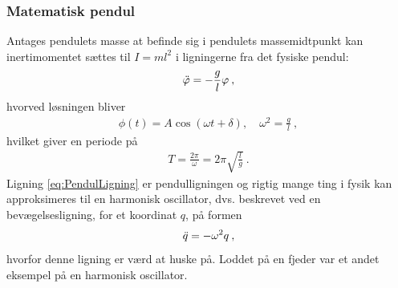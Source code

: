 \subsubsection*{Matematisk pendul}
Antages pendulets masse at befinde sig i pendulets massemidtpunkt kan inertimomentet sættes til $I=ml^2$ i ligningerne fra det fysiske pendul:
%
\begin{align} \label{eq:PendulLigning}
	\ddot{\varphi} = -\frac{g}{l}\varphi \: ,
\end{align}
%
hvorved løsningen bliver
%
\begin{align}
	\phi(t) = A\cos\left(\omega t + \delta\right), \quad \omega^2 = \frac{g}{l} \: ,
\end{align}
%
hvilket giver en periode på
%
\begin{align}
	T = \frac{2\pi}{\omega} = 2\pi\sqrt{\frac{l}{g}} \: .
\end{align}
%
Ligning \eqref{eq:PendulLigning} er pendulligningen og rigtig mange ting i fysik kan approksimeres til en harmonisk oscillator, dvs. beskrevet ved en bevægelsesligning, for et koordinat $q$, på formen
%
\begin{align}
	\ddot{q} = -\omega^2q \: ,
\end{align}
%
hvorfor denne ligning er værd at huske på. Loddet på en fjeder var et andet eksempel på en harmonisk oscillator.

